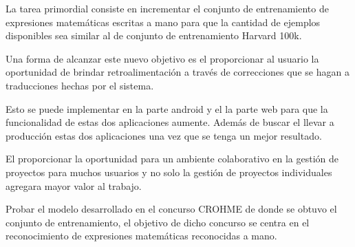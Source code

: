 La tarea primordial consiste en incrementar el conjunto de entrenamiento de expresiones matemáticas escritas a mano para que la cantidad de ejemplos disponibles sea similar al de conjunto de entrenamiento Harvard 100k.

Una forma de alcanzar este nuevo objetivo es el proporcionar al usuario la oportunidad de brindar retroalimentación a través de correcciones que se hagan a traducciones hechas por el sistema.

Esto se puede implementar en la parte android y el la parte web para que la funcionalidad de estas dos aplicaciones aumente. Además de buscar el llevar a producción estas dos aplicaciones una vez que se tenga un mejor resultado.

El proporcionar la oportunidad para un ambiente colaborativo en la gestión de proyectos para muchos usuarios y no solo la gestión de proyectos individuales agregara mayor valor al trabajo.

Probar el modelo desarrollado en el concurso CROHME de donde se obtuvo el conjunto de entrenamiento, el objetivo de dicho concurso se centra en el reconocimiento de expresiones matemáticas reconocidas a mano.


